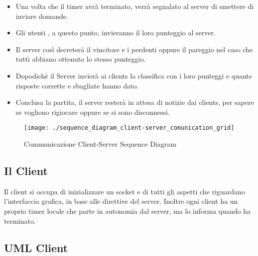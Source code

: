 \begin{itemize}
	\item \textsf{\normalsize Una volta che il timer avrà terminato, verrà segnalato al server di smettere di inviare domande.}
	\item \textsf{\normalsize Gli utenti , a questo punto, invieranno il loro punteggio al server.}
	\item \textsf{\normalsize Il server così decreterà il vincitore e i perdenti oppure il pareggio nel caso che tutti abbiano ottenuto lo stesso punteggio.}
	\item \textsf{\normalsize Dopodichè il Server invierà ai clients la classifica con i loro punteggi e quante risposte corrette e sbagliate hanno dato.}
	\item \textsf{\normalsize Conclusa la partita, il server resterà in attesa di notizie dai clients, per sapere se vogliono rigiocare oppure se si sono disconnessi.} %
\end{itemize}




\begin{figure}[p]
	\centering
	\texttt{[image: ./sequence\_diagram\_client-server\_comunication\_grid]}
	\caption{Communicazione Client-Server Sequence Diagram}
	\label{fig:sequence_diagram_client-server_comunication}
\end{figure}

\restoregeometry


\subsection{Il Client}
\textsf{\normalsize Il client si occupa di inizializzare un socket e di tutti gli aspetti che riguardano l'interfaccia grafica, in base alle direttive del server. Inoltre ogni client ha un proprio timer locale che parte in autonomia dal server, ma lo informa quando ha terminato.} \\

\subsection{UML Client}

